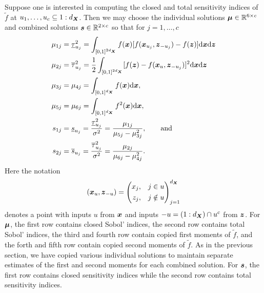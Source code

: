 \documentclass{article}[12pt]
\begin{document}
Suppose one is interested in computing the closed and total sensitivity indices of $\tilde{f}$ at $u_1,\dots,u_c \subseteq 1:d_{\boldsymbol{X}}$.  Then we may choose the individual solutions $\boldsymbol{\mu} \in \mathbb{R}^{6 \times c}$ and combined solutions $\boldsymbol{s} \in \mathbb{R}^{2 \times c}$ so that for $j=1,\dots,c$
\begin{align*}
    \mu_{1j} &= \underline{\tau}_{u_j}^2 = \int_{[0,1]^{2d_{\boldsymbol{X}}}} f(\boldsymbol{x})[f(\boldsymbol{x}_{u_j},\boldsymbol{z}_{-{u_j}})-f(\boldsymbol{z})]\mathrm{d}\boldsymbol{x}\mathrm{d}\boldsymbol{z} \\
    \mu_{2j} &= \overline{\tau}_{u_j}^2 = \frac{1}{2}\int_{[0,1]^{2d_{\boldsymbol{X}}}} [f(\boldsymbol{z})-f(\boldsymbol{x}_u,\boldsymbol{z}_{-{u_j}})]^2\mathrm{d}\boldsymbol{x}\mathrm{d}\boldsymbol{z} \\
    \mu_{3j} &= \mu_{4j} = \int_{[0,1]^{d_{\boldsymbol{X}}}} f(\boldsymbol{x})\mathrm{d}\boldsymbol{x}, \\
    \mu_{5j} &= \mu_{6j} = \int_{[0,1]^{d_{\boldsymbol{X}}}} f^2(\boldsymbol{x})\mathrm{d}\boldsymbol{x}, \\
    s_{1j} &= \underline{s}_{u_j} = \frac{\underline{\tau}_{u_j}^2}{\sigma^2} = \frac{\mu_{1j}}{\mu_{5j}-\mu_{3j}^2}, \qquad \text{and} \\
    s_{2j} &= \overline{s}_{u_j} = \frac{\overline{\tau}_{u_j}^2}{\sigma^2} = \frac{\mu_{2j}}{\mu_{6j}-\mu_{4j}^2}.  
\end{align*}
Here the notation
\begin{equation}
    (\boldsymbol{x}_{u},\boldsymbol{z}_{-u}) = \left(\begin{aligned}x_{j}, \quad & j \in u \\ z_{j}, \quad & j \notin u \end{aligned}\right)_{j=1}^{d_{\boldsymbol{X}}}
\end{equation}
denotes a point with inputs $u$ from $\boldsymbol{x}$ and inputs $-u=(1:d_{\boldsymbol{X}})\cap u^c$ from $\boldsymbol{z}$.
For $\boldsymbol{\mu}$, the first row contains closed Sobol' indices, the second row contains total Sobol' indices, the third and fourth row contain copied first moments of $\tilde{f}$, and the forth and fifth row contain copied second moments of $\tilde{f}$. As in the previous section, we have copied various individual solutions to maintain separate estimates of the first and second moments for each combined solution. For $\boldsymbol{s}$, the first row contains closed sensitivity indices while the second row contains total sensitivity indices. 
\end{document}
